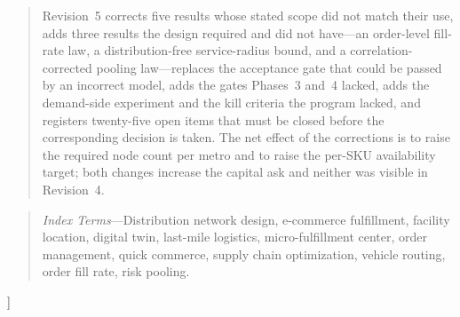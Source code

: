 \documentclass[10pt,twocolumn,letterpaper]{article}
\theoremstyle{definition}
\begin{document}
\begin{@twocolumnfalse}
\begin{quotation}
Revision~5 corrects five results whose stated scope did not match their use, adds three results the design required and did not have---an order-level fill-rate law, a distribution-free service-radius bound, and a correlation-corrected pooling law---replaces the acceptance gate that could be passed by an incorrect model, adds the gates Phases~3 and~4 lacked, adds the demand-side experiment and the kill criteria the program lacked, and registers twenty-five open items that must be closed before the corresponding decision is taken. The net effect of the corrections is to raise the required node count per metro and to raise the per-SKU availability target; both changes increase the capital ask and neither was visible in Revision~4.
\end{quotation}
\begin{quotation}\noindent\footnotesize
\textit{Index Terms}---Distribution network design, e-commerce fulfillment, facility location, digital twin, last-mile logistics, micro-fulfillment center, order management, quick commerce, supply chain optimization, vehicle routing, order fill rate, risk pooling.
\end{quotation}
\vspace{10pt}
\end{@twocolumnfalse}
]

\renewcommand{\thefootnote}{\fnsymbol{footnote}}
\renewcommand{\thefootnote}{\arabic{footnote}}




















\end{document}
